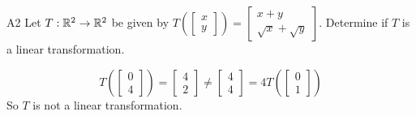 \documentclass{sbgLAquiz}
\begin{document}
\begin{problem}{A2} 
Let $T: \mathbb{R}^2 \rightarrow \mathbb{R}^2$ be given by $T\left(\begin{bmatrix}x \\ y  \end{bmatrix} \right) = \begin{bmatrix} x+y \\ \sqrt{x}+\sqrt{y} \end{bmatrix}$.  Determine if $T$ is a linear transformation.
\end{problem}
\begin{solution}
$$T\left(\begin{bmatrix} 0 \\ 4 \end{bmatrix}\right) = \begin{bmatrix} 4 \\ 2 \end{bmatrix} \neq \begin{bmatrix} 4 \\ 4 \end{bmatrix} = 4T\left(\begin{bmatrix} 0 \\ 1 \end{bmatrix} \right)$$
So $T$ is not a linear transformation.
\end{solution}
\end{document}
